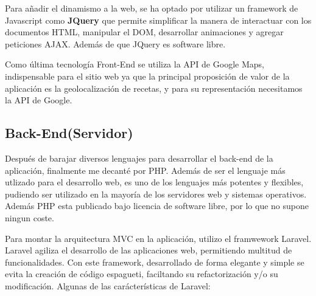 Para añadir el dinamismo a la web, se ha optado por utilizar un framework de Javascript como \textbf{JQuery} que permite simplificar la manera de interactuar con los documentos HTML, manipular el DOM, desarrollar animaciones y agregar peticiones AJAX. Además de que JQuery es software libre.

\vspace{5 mm}

Como última tecnología Front-End se utiliza la API de Google Maps, indispensable para el sitio web ya que la principal proposición de valor de la aplicación es la geolocalización de recetas, y para su representación necesitamos la API de Google.


\subsection{Back-End(Servidor)}

Después de barajar diversos lenguajes para desarrollar el back-end de la aplicación, finalmente me decanté por PHP. Además de ser el lenguaje más utlizado para el desarrollo web, es uno de los lenguajes más potentes y flexibles, pudiendo ser utilizado en la mayoría de los servidores web y sistemas operativos. Además PHP esta publicado bajo licencia de software libre, por lo que no supone ningun coste.


\vspace{5 mm}

Para montar la arquitectura MVC en la aplicación, utilizo el framwework Laravel. Laravel agiliza el desarrollo de las aplicaciones web, permitiendo multitud de funcionalidades. Con este framework, desarrollado de forma elegante y simple se evita la creación de código espagueti, faciltando su refactorización y/o su modificación. Algunas de las carácterísticas de Laravel: 


